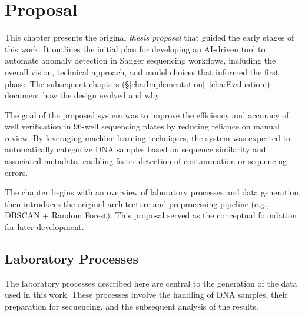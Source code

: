 
%

\makeatletter
\newcommand{\ntifpkgloaded}{%
  \@ifpackageloaded%
}
\makeatother


\chapter{Proposal}
\label{cha:Proposal}


This chapter presents the original \emph{thesis proposal} that guided the early stages of this work. It outlines the initial plan for developing an AI-driven tool to automate anomaly detection in Sanger sequencing workflows, including the overall vision, technical approach, and model choices that informed the first phase. The subsequent chapters (\S\ref{cha:Implementation}--\ref{cha:Evaluation}) document how the design evolved and why.

The goal of the proposed system was to improve the efficiency and accuracy of well verification in 96-well sequencing plates by reducing reliance on manual review. By leveraging machine learning techniques, the system was expected to automatically categorize DNA samples based on sequence similarity and associated metadata, enabling faster detection of contamination or sequencing errors.

The chapter begins with an overview of laboratory processes and data generation, then introduces the original architecture and preprocessing pipeline (e.g., DBSCAN + Random Forest). This proposal served as the conceptual foundation for later development.

\section{Laboratory Processes}
\label{sec:laboratory}

The laboratory processes described here are central to the generation of the data used in this work. These processes involve the handling of DNA samples, their preparation for sequencing, and the subsequent analysis of the results.

